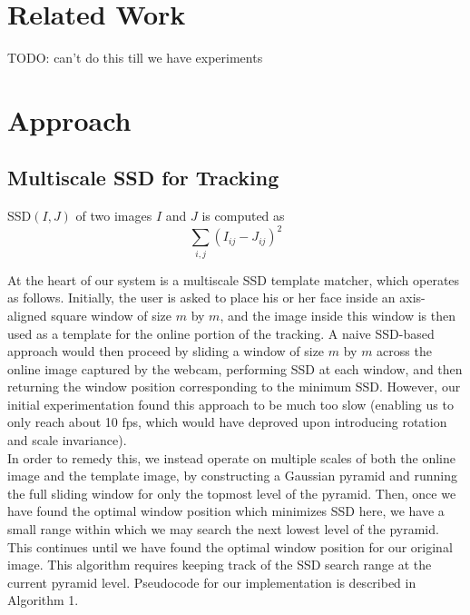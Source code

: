 \documentclass[10pt,twocolumn,letterpaper]{article}
\begin{document}
\section{Related Work}
TODO: can't do this till we have experiments

\section{Approach}

\subsection*{Multiscale SSD for Tracking}
SSD$(I, J)$ of two images $I$ and $J$ is computed as
$$\displaystyle\sum_{i, j}(I_{ij} - J_{ij})^{2}$$

At the heart of our system is a multiscale SSD template matcher, which operates as follows.
Initially, the user is asked to place his or her face inside an axis-aligned square window of size
$m$ by $m$, and the image inside this window is then used as a template for the online
portion of the tracking. A naive SSD-based approach would then proceed by sliding a window of
size $m$ by $m$ across the online image captured by the webcam, performing SSD at each window,
and then returning the window position corresponding to the minimum SSD. However, our initial
experimentation found this approach to be much too slow (enabling us to only reach about 10 fps,
which would have deproved upon introducing rotation and scale invariance).\\

In order to remedy this, we instead operate on multiple scales of both the online image and the
template image, by constructing a Gaussian pyramid and running the full sliding window for only
the topmost level of the pyramid. Then, once we have found the optimal window position which
minimizes SSD here, we have a small range within which we may search the next lowest level of
the pyramid. This continues until we have found the optimal window position for our original image.
This algorithm requires keeping track of the SSD search range at the current pyramid level.
Pseudocode for our implementation is described in Algorithm 1.\\
\end{document}
